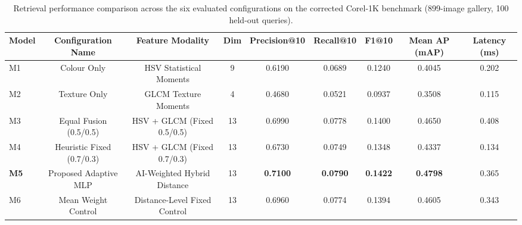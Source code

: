\begin{table}[!t]
\centering
\caption{Retrieval performance comparison across the six evaluated configurations on the corrected Corel-1K benchmark (899-image gallery, 100 held-out queries).}
\label{tab:main_results}
\begin{tabular}{lcccccccc}
\toprule
\textbf{Model} & \textbf{Configuration Name} & \textbf{Feature Modality} & \textbf{Dim} & \textbf{Precision@10} & \textbf{Recall@10} & \textbf{F1@10} & \textbf{Mean AP (mAP)} & \textbf{Latency (ms)} \\
\midrule
M1 & Colour Only & HSV Statistical Moments & 9 & 0.6190 & 0.0689 & 0.1240 & 0.4045 & 0.202 \\
M2 & Texture Only & GLCM Texture Moments & 4 & 0.4680 & 0.0521 & 0.0937 & 0.3508 & 0.115 \\
M3 & Equal Fusion (0.5/0.5) & HSV + GLCM (Fixed 0.5/0.5) & 13 & 0.6990 & 0.0778 & 0.1400 & 0.4650 & 0.408 \\
M4 & Heuristic Fixed (0.7/0.3) & HSV + GLCM (Fixed 0.7/0.3) & 13 & 0.6730 & 0.0749 & 0.1348 & 0.4337 & 0.134 \\
\textbf{M5} & Proposed Adaptive MLP & AI-Weighted Hybrid Distance & 13 & \textbf{0.7100} & \textbf{0.0790} & \textbf{0.1422} & \textbf{0.4798} & 0.365 \\
M6 & Mean Weight Control & Distance-Level Fixed Control & 13 & 0.6960 & 0.0774 & 0.1394 & 0.4605 & 0.343 \\
\bottomrule
\end{tabular}
\end{table}